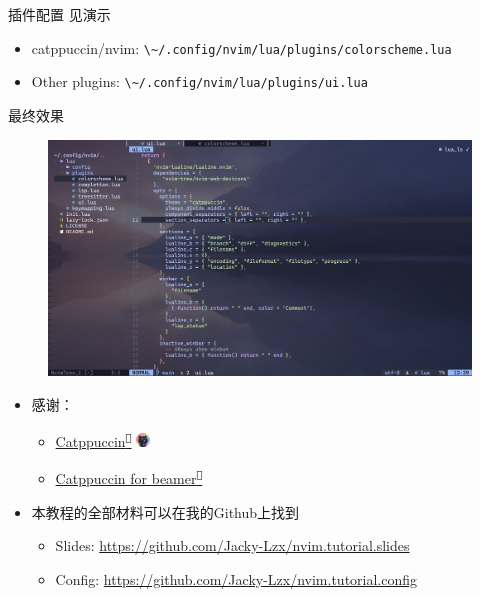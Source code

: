 \documentclass[aspectratio=169]{ctexbeamer}
\newcommand{\nerd}[1]{\texttt{#1}}
\newcommand{\link}[3][]{\href{#3}{#2\textsuperscript{\nerd{}}}}
\begin{document}
  \begin{frame}{插件配置}
    见演示

    \begin{itemize}
      \item catppuccin/nvim: \lstinline[language={},style=path]{\~/.config/nvim/lua/plugins/colorscheme.lua}
      \item Other plugins: \lstinline[language={},style=path]{\~/.config/nvim/lua/plugins/ui.lua}
    \end{itemize}
  \end{frame}

  \begin{frame}{最终效果}
    \begin{figure}[H]
      \centering
      \includegraphics[width=0.75\linewidth]{./Figures/Final_Result.jpg}
    \end{figure}
  \end{frame}

  \begin{frame}
    \begin{itemize}
      \item 感谢：
        \begin{itemize}
          \item \link{Catppuccin}{https://catppuccin.com/} \includegraphics[height=10pt]{./Figures/Catppuccin_logo.png}
          \item \link{Catppuccin for beamer}{https://github.com/atticus-sullivan/beamercolortheme}
        \end{itemize}
        \vspace{0.5cm}
      \item 本教程的全部材料可以在我的Github上找到
        \begin{itemize}
          \item Slides: \url{https://github.com/Jacky-Lzx/nvim.tutorial.slides}
          \item Config: \url{https://github.com/Jacky-Lzx/nvim.tutorial.config}
        \end{itemize}
    \end{itemize}
  \end{frame}
\end{document}
